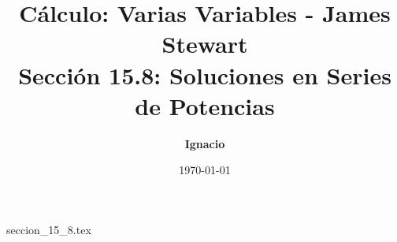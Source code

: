 \documentclass[11pt,spanish,oneside]{report}
\title{\textbf{Cálculo: Varias Variables - James Stewart} \\ \Large Sección 15.8: Soluciones en Series de Potencias}
\author{\textbf{Ignacio}}
\date{\today}
\begin{document}
\maketitle

{seccion_15_8.tex}
\end{document}
